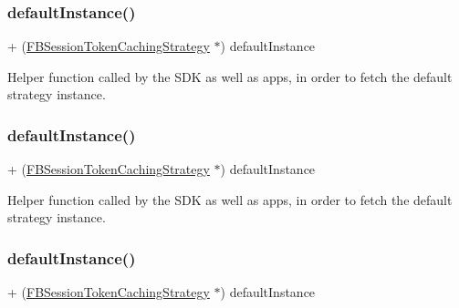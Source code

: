 \subsubsection{\texorpdfstring{default\+Instance()}{defaultInstance()}\hspace{0.1cm}{\footnotesize\ttfamily [2/5]}}
{\footnotesize\ttfamily + (\hyperlink{interfaceFBSessionTokenCachingStrategy}{F\+B\+Session\+Token\+Caching\+Strategy} $\ast$) default\+Instance \begin{DoxyParamCaption}{ }\end{DoxyParamCaption}}

Helper function called by the S\+DK as well as apps, in order to fetch the default strategy instance. \mbox{\label{interfaceFBSessionTokenCachingStrategy_a293d422412b33d069fef99f651b74b87}} 
\subsubsection{\texorpdfstring{default\+Instance()}{defaultInstance()}\hspace{0.1cm}{\footnotesize\ttfamily [3/5]}}
{\footnotesize\ttfamily + (\hyperlink{interfaceFBSessionTokenCachingStrategy}{F\+B\+Session\+Token\+Caching\+Strategy} $\ast$) default\+Instance \begin{DoxyParamCaption}{ }\end{DoxyParamCaption}}

Helper function called by the S\+DK as well as apps, in order to fetch the default strategy instance. \mbox{\label{interfaceFBSessionTokenCachingStrategy_a293d422412b33d069fef99f651b74b87}} 
\subsubsection{\texorpdfstring{default\+Instance()}{defaultInstance()}\hspace{0.1cm}{\footnotesize\ttfamily [4/5]}}
{\footnotesize\ttfamily + (\hyperlink{interfaceFBSessionTokenCachingStrategy}{F\+B\+Session\+Token\+Caching\+Strategy} $\ast$) default\+Instance \begin{DoxyParamCaption}{ }\end{DoxyParamCaption}}

